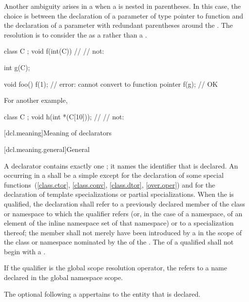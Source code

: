 \pnum
Another ambiguity arises in a
 when a
is nested in parentheses.
In this case, the choice is between the declaration of a parameter of type
pointer to function and the declaration of a parameter with redundant
parentheses around the
.
The resolution is to consider the
as a
rather than a
.
\begin{example}
\begin{codeblock}
class C { };
void f(int(C)) { }              // 
                                // not: 

int g(C);

void foo() {
  f(1);                         // error: cannot convert  to function pointer
  f(g);                         // OK
}
\end{codeblock}

For another example,
\begin{codeblock}
class C { };
void h(int *(C[10]));           // 
                                // not: 
\end{codeblock}
\end{example}

[dcl.meaning]{Meaning of declarators}%

[dcl.meaning.general]{General}%

\pnum
{}%
A declarator contains exactly one
;
it names the identifier that is declared.
An
occurring in
a
shall be a simple
except for the declaration of some special functions~(\ref{class.ctor},
\ref{class.conv}, \ref{class.dtor}, \ref{over.oper}) and
for the declaration of template specializations
or partial specializations.
When the
is qualified, the declaration shall refer to a previously declared member
of the class or namespace to which the qualifier refers (or,
in the case of a namespace,
of an element of the inline namespace
set of that namespace) or to a specialization thereof; the member
shall not merely have been introduced by a
in the scope of the class or namespace nominated by the
of the
.
The  of a qualified  shall not
begin with a .
\begin{note}
If the qualifier is the global
\tcode{::}
scope resolution operator, the
refers to a name declared in the global namespace scope.
\end{note}
The optional  following a  appertains to the entity that is declared.

